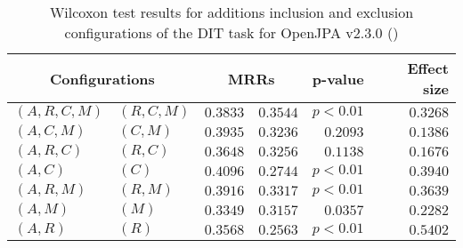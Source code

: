 
\begin{table}
\begin{spacing}{1.2}
\centering
\caption{Wilcoxon test results for additions inclusion and exclusion configurations of the DIT task for OpenJPA v2.3.0 (\ctwo)}
\label{table:versus-wilcox-openjpa-dit-additions}
\begin{tabular}{ll|rr|rr}
\toprule
      \multicolumn{2}{c|}{Configurations} &                \multicolumn{2}{c|}{MRRs} &        p-value & Effect size \\
\midrule
 $(A,R,C,M)$ &  $(R,C,M)$ &  $\bm{0.3833}$ &  $0.3544$ & $p<0.01$ &    $0.3268$ \\
   $(A,C,M)$ &    $(C,M)$ &  $\bm{0.3935}$ &  $0.3236$ & $0.2093$ &    $0.1386$ \\
   $(A,R,C)$ &    $(R,C)$ &  $\bm{0.3648}$ &  $0.3256$ & $0.1138$ &    $0.1676$ \\
     $(A,C)$ &      $(C)$ &  $\bm{0.4096}$ &  $0.2744$ & $p<0.01$ &    $0.3940$ \\
   $(A,R,M)$ &    $(R,M)$ &  $\bm{0.3916}$ &  $0.3317$ & $p<0.01$ &    $0.3639$ \\
     $(A,M)$ &      $(M)$ &  $\bm{0.3349}$ &  $0.3157$ & $0.0357$ &    $0.2282$ \\
     $(A,R)$ &      $(R)$ &  $\bm{0.3568}$ &  $0.2563$ & $p<0.01$ &    $0.5402$ \\
\bottomrule
\end{tabular}

\end{spacing}
\end{table}


